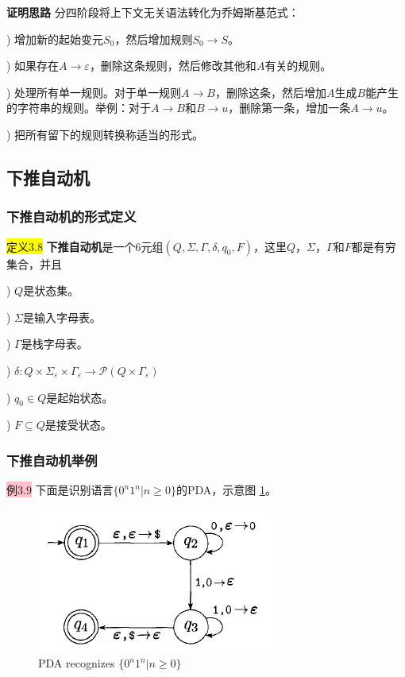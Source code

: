 \documentclass[a4paper]{article}
\begin{document}
	\textbf{证明思路} \quad 分四阶段将上下文无关语法转化为乔姆斯基范式：
	
	) 增加新的起始变元$S_0$，然后增加规则$S_0 \rightarrow S$。

	) 如果存在$A \rightarrow \varepsilon$，删除这条规则，然后修改其他和$A$有关的规则。
	
	) 处理所有单一规则。对于单一规则$A \rightarrow B$，删除这条，然后增加$A$生成$B$能产生的字符串的规则。举例：对于$A \rightarrow B$和$B \rightarrow u$，删除第一条，增加一条$A \rightarrow u$。
	
	) 把所有留下的规则转换称适当的形式。

\subsection{下推自动机}

\subsubsection{下推自动机的形式定义}

	\colorbox{yellow}{定义3.8} \textbf{下推自动机}是一个$6$元组$(Q,\Sigma,\Gamma,\delta,q_0, F)$，这里$Q$，$\Sigma$，$\Gamma$和$F$都是有穷集合，并且
	
	) $Q$是状态集。
	
	) $\Sigma$是输入字母表。
	
	) $\Gamma$是栈字母表。
	
	) $\delta:Q \times \Sigma_\varepsilon \times \Gamma_\varepsilon \rightarrow \mathcal{P}(Q \times \Gamma_\varepsilon)$
	
	) $q_0 \in Q$是起始状态。
	
	) $F \subseteq Q$是接受状态。

\subsubsection{下推自动机举例}

	\colorbox{pink}{例3.9} 下面是识别语言$\{0^n1^n|n \geq 0\}$的PDA，示意图 \ref{F030202}。
	
	\begin{figure}[htb]
		\centering
		\includegraphics[scale=0.8]{./figure/3.2.2.png}
		\caption{PDA recognizes $\{0^n1^n|n \geq 0\}$}
		\label{F030202}
	\end{figure}
\end{document}
